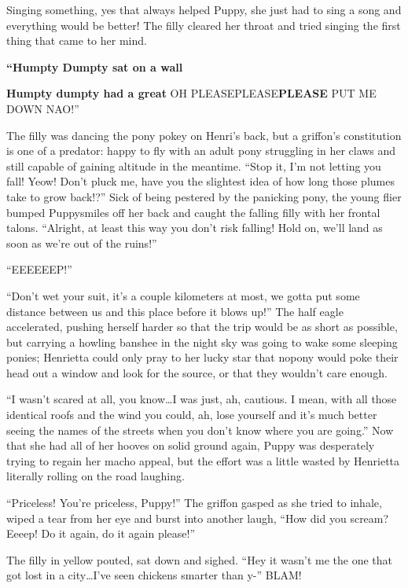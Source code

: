 Singing something, yes that always helped Puppy, she just had to sing a song and everything would be better! The filly cleared her throat and tried singing the first thing that came to her mind.

\textbf{``Humpty Dumpty sat on a wall}

\textbf{Humpty dumpty had a great} OH PLEASEPLEASE\textbf{PLEASE} PUT ME DOWN NAO!''

The filly was dancing the pony pokey on Henri's back, but a griffon's constitution is one of a predator: happy to fly with an adult pony struggling in her claws and still capable of gaining altitude in the meantime. ``Stop it, I'm not letting you fall! Yeow! Don't pluck me, have you the slightest idea of how long those plumes take to grow back!?'' Sick of being pestered by the panicking pony, the young flier bumped Puppysmiles off her back and caught the falling filly with her frontal talons. ``Alright, at least this way you don't risk falling! Hold on, we'll land as soon as we're out of the ruins!''

``EEEEEEP!''

``Don't wet your suit, it's a couple kilometers at most, we gotta put some distance between us and this place before it blows up!'' The half eagle accelerated, pushing herself harder so that the trip would be as short as possible, but carrying a howling banshee in the night sky was going to wake some sleeping ponies; Henrietta could only pray to her lucky star that nopony would poke their head out a window and look for the source, or that they wouldn't care enough.

\horizonline


``I wasn't scared at all, you know\dots I was just, ah, cautious. I mean, with all those identical roofs and the wind you could, ah, lose yourself and it's much better seeing the names of the streets when you don't know where you are going.'' Now that she had all of her hooves on solid ground again, Puppy was desperately trying to regain her macho appeal, but the effort was a little wasted by Henrietta literally rolling on the road laughing.

``Priceless! You're priceless, Puppy!'' The griffon gasped as she tried to inhale, wiped a tear from her eye and burst into another laugh, ``How did you scream? Eeeep! Do it again, do it again please!''

The filly in yellow pouted, sat down and sighed. ``Hey it wasn't me the one that got lost in a city\dots I've seen chickens smarter than y-'' BLAM!


